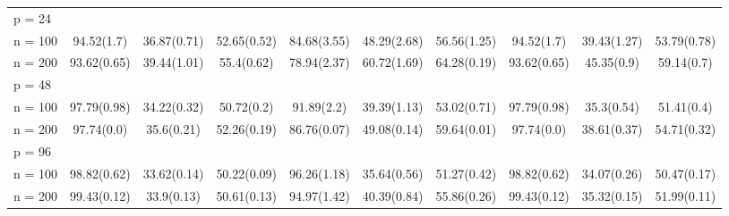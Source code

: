 \begin{table}[p]
{\begin{tabular}{l@{\hskip 0.4in} ccc ccc ccc}
 p = 24 & & & & & & & & & \\
\multicolumn{1}{r}{n = 100}&94.52(1.7)&36.87(0.71)&52.65(0.52)&84.68(3.55)&48.29(2.68)&56.56(1.25)&94.52(1.7)&39.43(1.27)&53.79(0.78)\\
\multicolumn{1}{r}{n = 200}&93.62(0.65)&39.44(1.01)&55.4(0.62)&78.94(2.37)&60.72(1.69)&64.28(0.19)&93.62(0.65)&45.35(0.9)&59.14(0.7)\\
 p = 48 & & & & & & & & & \\
\multicolumn{1}{r}{n = 100}&97.79(0.98)&34.22(0.32)&50.72(0.2)&91.89(2.2)&39.39(1.13)&53.02(0.71)&97.79(0.98)&35.3(0.54)&51.41(0.4)\\
\multicolumn{1}{r}{n = 200}&97.74(0.0)&35.6(0.21)&52.26(0.19)&86.76(0.07)&49.08(0.14)&59.64(0.01)&97.74(0.0)&38.61(0.37)&54.71(0.32)\\
 p = 96 & & & & & & & & & \\
\multicolumn{1}{r}{n = 100}&98.82(0.62)&33.62(0.14)&50.22(0.09)&96.26(1.18)&35.64(0.56)&51.27(0.42)&98.82(0.62)&34.07(0.26)&50.47(0.17)\\
\multicolumn{1}{r}{n = 200}&99.43(0.12)&33.9(0.13)&50.61(0.13)&94.97(1.42)&40.39(0.84)&55.86(0.26)&99.43(0.12)&35.32(0.15)&51.99(0.11)\\
\end{tabular}}
\label{table:precision-homogeneous}
\end{table}